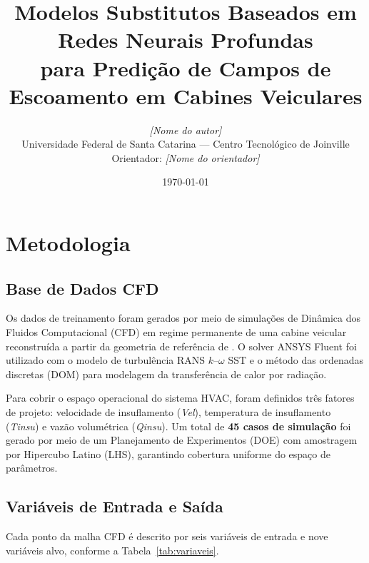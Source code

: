 \documentclass[12pt, a4paper]{article}
\title{%
  Modelos Substitutos Baseados em Redes Neurais Profundas\\
  para Predição de Campos de Escoamento em Cabines Veiculares
}
\author{%
  \textit{[Nome do autor]}\\
  Universidade Federal de Santa Catarina --- Centro Tecnológico de Joinville\\
  Orientador: \textit{[Nome do orientador]}
}
\date{\today}
\begin{document}
\maketitle
\tableofcontents
\newpage

\section{Metodologia}
\label{sec:metodologia}

\subsection{Base de Dados CFD}
\label{sec:dados}

Os dados de treinamento foram gerados por meio de simulações de Dinâmica dos
Fluidos Computacional (CFD) em regime permanente de uma cabine veicular
reconstruída a partir da geometria de referência de \cite{mao2018}.
O solver ANSYS Fluent foi utilizado com o modelo de turbulência RANS
$k$--$\omega$ SST e o método das ordenadas discretas (DOM) para modelagem
da transferência de calor por radiação.

Para cobrir o espaço operacional do sistema HVAC, foram definidos três fatores
de projeto: velocidade de insuflamento (\textit{Vel}), temperatura de
insuflamento (\textit{Tinsu}) e vazão volumétrica (\textit{Qinsu}).
Um total de \textbf{45 casos de simulação} foi gerado por meio de um
Planejamento de Experimentos (DOE) com amostragem por Hipercubo Latino (LHS),
garantindo cobertura uniforme do espaço de parâmetros.

\subsection{Variáveis de Entrada e Saída}
\label{sec:variaveis}

Cada ponto da malha CFD é descrito por seis variáveis de entrada e nove
variáveis alvo, conforme a Tabela~\ref{tab:variaveis}.
\end{document}
